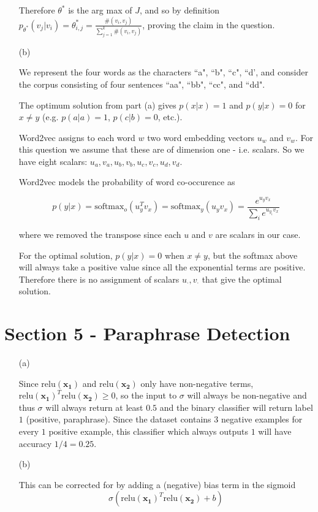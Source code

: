 \documentclass[12pt,letterpaper]{article}
\begin{document}
\begin{itemize}
    Therefore $\theta^*$ is the arg max of $J$, and so by definition $p_{\theta^*}(v_j | v_i) = \theta^*_{i,j} = \frac{\#(v_i, v_j)}{\sum_{j=1}^k \#(v_i, v_j)}$, proving the claim in the question. 
    
    \item[(b)]
    
    We represent the four words as the characters ``a", ``b", ``c", ``d', and consider the corpus consisting of four sentences ``aa", ``bb", ``cc", and ``dd".
    
    The optimum solution from part (a) gives $p(x|x) = 1$ and $p(y|x) = 0$ for $x \neq y$ (e.g. $p(a|a)=1$, $p(c|b) = 0$, etc.).
    
    Word2vec assigns to each word $w$ two word embedding vectors $u_w$ and $v_w$. For this question we assume that these are of dimension one - i.e. scalars. So we have eight scalars: $u_a, v_a, u_b, v_b, u_c, v_c, u_d, v_d$.
    
    Word2vec models the probability of word co-occurence as
    
    $$p(y | x) = \text{softmax}_o(u_y^T v_x) = \text{softmax}_y(u_y v_x) = \frac{e^{u_y v_x}}{\sum_i e^{u_{y_i} v_x}}$$
    
    where we removed the transpose since each $u$ and $v$ are scalars in our case.
    
    For the optimal solution, $p(y|x)=0$ when $x \neq y$, but the softmax above will always take a positive value since all the exponential terms are positive. Therefore there is no assignment of scalars $u_\cdot, v_\cdot$ that give the optimal solution.
    
    
    
    
    
    
\end{itemize}

\section*{Section 5 - Paraphrase Detection}

\begin{itemize}
    \item[(a)]
    
    Since $\text{relu}(\mathbf{x_1})$ and $\text{relu}(\mathbf{x_2})$ only have non-negative terms, $\text{relu}(\mathbf{x_1})^T \text{relu}(\mathbf{x_2}) \geq 0$, so the input to $\sigma$ will always be non-negative and thus $\sigma$ will always return at least $0.5$ and the binary classifier will return label $1$ (positive, paraphrase). Since the dataset contains $3$ negative examples for every $1$ positive example, this classifier which always outputs $1$ will have accuracy $1/4=0.25$.
    
    \item[(b)]
    
    This can be corrected for by adding a (negative) bias term in the sigmoid
    $$\sigma(\text{relu}(\mathbf{x_1})^T \text{relu}(\mathbf{x_2}) + b)$$
\end{itemize}
\end{document}
